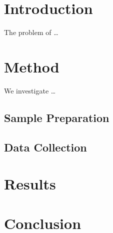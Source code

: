 \documentclass{article}
\begin{document}
\section{Introduction}
The problem of \ldots

\section{Method}
We investigate \ldots

\subsection{Sample Preparation}
\subsection{Data Collection}
\section{Results}
\section{Conclusion}
\end{document}
